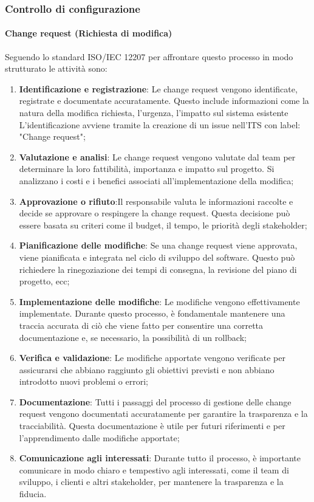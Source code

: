 \documentclass{article}
\begin{document}
\subsubsection{Controllo di configurazione}
\paragraph{Change request (Richiesta di modifica)}
Seguendo lo standard  ISO/IEC 12207 per affrontare questo processo in modo strutturato le attività sono:
\begin{enumerate}
    \item \textbf{Identificazione e registrazione}: Le change request vengono identificate, registrate e documentate accuratamente. Questo include informazioni come la natura della modifica richiesta, l'urgenza, l'impatto sul sistema esistente\\
          L'identificazione avviene tramite la creazione di un issue nell'ITS con label: "Change request";
    \item \textbf{Valutazione e analisi}: Le change request vengono valutate dal team per determinare la loro fattibilità, importanza e impatto sul progetto. Si analizzano i costi e i benefici associati all'implementazione della modifica;
    \item \textbf{Approvazione o rifiuto}:Il responsabile valuta le informazioni raccolte e decide se approvare o respingere la change request. Questa decisione può essere basata su criteri come il budget, il tempo, le priorità degli stakeholder;
    \item \textbf{Pianificazione delle modifiche}: Se una change request viene approvata, viene pianificata e integrata nel ciclo di sviluppo del software. Questo può richiedere la rinegoziazione dei tempi di consegna, la revisione del piano di progetto, ecc;
    \item \textbf{Implementazione delle modifiche}: Le modifiche vengono effettivamente implementate. Durante questo processo, è fondamentale mantenere una traccia accurata di ciò che viene fatto per consentire una corretta documentazione e, se necessario, la possibilità di un rollback;
    \item \textbf{Verifica e validazione}: Le modifiche apportate vengono verificate per assicurarsi che abbiano raggiunto gli obiettivi previsti e non abbiano introdotto nuovi problemi o errori;
    \item \textbf{Documentazione}: Tutti i passaggi del processo di gestione delle change request vengono documentati accuratamente per garantire la trasparenza e la tracciabilità. Questa documentazione è utile per futuri riferimenti e per l'apprendimento dalle modifiche apportate;
    \item \textbf{Comunicazione agli interessati}: Durante tutto il processo, è importante comunicare in modo chiaro e tempestivo agli interessati, come il team di sviluppo, i clienti e altri stakeholder, per mantenere la trasparenza e la fiducia.
\end{enumerate}
\end{document}
